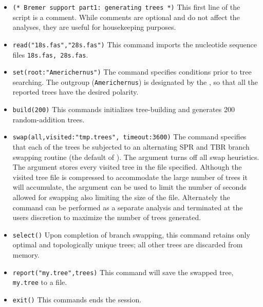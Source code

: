 \begin{itemize}
\item \texttt{(* Bremer support part1: generating trees *)} This first line of the script is a comment. While comments are optional and do not affect the analyses, they are useful for housekeeping purposes. 
\item \texttt{read("18s.fas","28s.fas")} This command imports the nucleotide sequence files \texttt{18s.fas, 28s.fas}.
\item \texttt{set(root:"Americhernus")} The  command specifies conditions prior to tree searching. The outgroup (\texttt{Americhernus}) is designated by the , so that all the reported trees have the desired polarity.     
\item \texttt{build(200)} This commands initializes tree-building and generates 200 random-addition trees.      
\item \texttt{swap(all,visited:"tmp.trees", timeout:3600)} The  command specifies that each of the trees be subjected to an alternating SPR and TBR branch swapping routine (the default of \poy).  The  argument turns off all swap heuristics. The  argument stores every visited tree in the file specified.  Although the visited tree file is compressed to accommodate the large number of trees it will accumulate, the argument  can be used to limit the number of seconds allowed for swapping also limiting the size of the file.  Alternately  the   command can be performed as a separate analysis and terminated at the users discretion to maximize the number of trees generated.
\item \texttt{select()} Upon completion of branch swapping, this command retains only optimal and topologically unique trees; all other trees are discarded from memory. 
\item \texttt{report("my.tree",trees)} This command will save the swapped tree, \\ \texttt{my.tree} to a file. 
\item \texttt{exit()} This commands ends the \poy session.


\end{itemize}
